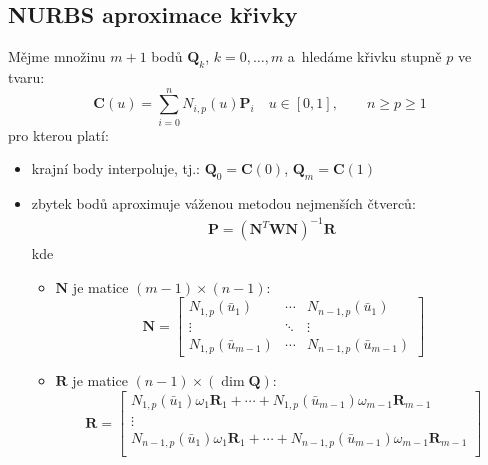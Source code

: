 \subsection{NURBS aproximace křivky\label{sec:NURBS aproximace křivky}}
Mějme množinu $m + 1$ bodů $\bm{Q}_k$, ${k = 0, \ldots, m}$ a~hledáme
křivku stupně $p$ ve tvaru:
\begin{equation}
    \bm{C}(u) = \sum_{i = 0}^{n}N_{i,p}(u)\bm{P}_i\quad u\in[0,1], \quad\quad n \ge p \ge 1
\end{equation}
pro kterou platí:
\begin{itemize}
    \item krajní body interpoluje, tj.: $\bm{Q}_0 = \bm{C}(0)$, $\bm{Q}_m = \bm{C}(1)$
    \item zbytek bodů aproximuje váženou metodou nejmenších čtverců:
          \begin{align}
              \bm{P} = (\bm{N}^T \bm{W} \bm{N})^{-1}\bm{R}
          \end{align}
          kde
          \begin{itemize}
              \item $\bm{N}$ je matice $(m - 1) \times (n - 1)$:
                    \begin{equation}
                        \bm{N} = \begin{bmatrix}
                            N_{1,p}(\bar{u}_1)        & \cdots & N_{n-1,p}(\bar{u}_1)     \\
                            \vdots                    & \ddots & \vdots                   \\
                            N_{1, p}(\bar{u}_{m - 1}) & \cdots & N_{n-1,p}(\bar{u}_{m-1})
                        \end{bmatrix}
                    \end{equation}
              \item $\bm{R}$ je matice $(n - 1)\times(\dim\bm{Q})$:
                    \begin{equation}
                        \bm{R} =
                        \begin{bmatrix}
                            N_{1,p}(\bar{u}_1)\omega_1\bm{R}_1 + \cdots + N_{1, p}(\bar{u}_{m - 1})\omega_{m-1}\bm{R}_{m - 1}     \\
                            \vdots                                                                                                \\
                            N_{n-1,p}(\bar{u}_1)\omega_1\bm{R}_1 + \cdots + N_{n-1, p}(\bar{u}_{m - 1})\omega_{m-1}\bm{R}_{m - 1} \\

\end{bmatrix}
\end{equation}
\end{itemize}
\end{itemize}
